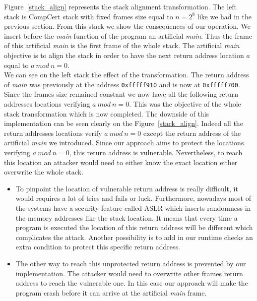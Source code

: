 \documentclass[11pt]{sdm}
\begin{document}
Figure~\ref{stack_align} represents the stack alignment transformation. The left stack is CompCert stack with fixed frames size equal to $n=2^8$ like we had in the previous section. From this stack we show the consequences of our operation. We insert before the \textit{main} function of the program an artificial \textit{main}. Thus the frame of this artificial \textit{main} is the first frame of the whole stack. The artificial \textit{main} objective is to align the stack in order to have the next return address location $a$ equal to $a~mod~n=0$. \\
We can see on the left stack the effect of the transformation. The return address of \textit{main} was previously at the address \texttt{0xfffff910} and is now at \texttt{0xfffff700}. Since the frames size remained constant we now have all the following return addresses locations verifying $a~mod~n=0$. This was the objective of the whole stack transformation which is now completed.
The downside of this implementation can be seen clearly on the Figure~\ref{stack_align}. Indeed all the return addresses locations verify $a~mod~n=0$ except the return address of the artificial \textit{main} we introduced.
Since our approach aims to protect the locations verifying $a~mod~n=0$, this return address is vulnerable.
Nevertheless, to reach this location an attacker would need to either know the exact location either overwrite the whole stack.
\begin{itemize}
	\item To pinpoint the location of vulnerable return address is really difficult, it would requires a lot of tries and fails or luck. Furthermore, nowadays most of the systems have a security feature called ASLR which inserts randomness in the memory addresses like the stack location. It means that every time a program is executed the location of this return address will be different which complicates the attack. Another possibility is to add in our runtime checks an extra condition to protect this specific return address.
	\item The other way to reach this unprotected return address is prevented by our implementation. The attacker would need to overwrite other frames return address to reach the vulnerable one. In this case our approach will make the program crash before it can arrive at the artificial \textit{main} frame.
\end{itemize}
\end{document}
